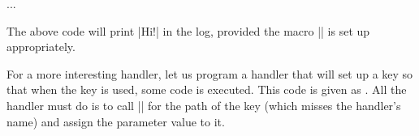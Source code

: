 \begin{codeexample}
{%
  \pgfkeysgetvalue{\pgfkeyscurrentpath}{\temp}
  \writetolog{\temp}
}
...
\end{codeexample}
The above code will print |Hi!| in the log, provided the macro
|\writetolog| is set up appropriately.

For a more interesting handler, let us program a handler that will
set up a key so that when the key is used, some code is executed. This
code is given as . All the handler must do is to call
|\pgfkeysdef| for the path of the key (which misses the handler's
name) and assign the parameter value to it.
\begin{codeexample}[]
\end{codeexample}

